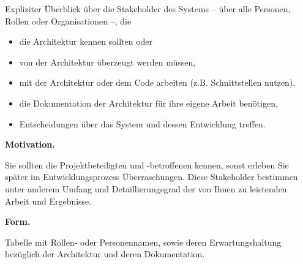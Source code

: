 \documentclass[]{article}
\begin{document}
Expliziter Überblick über die Stakeholder des Systems -- über alle
Personen, Rollen oder Organisationen --, die

\begin{itemize}
\item
  die Architektur kennen sollten oder
\item
  von der Architektur überzeugt werden müssen,
\item
  mit der Architektur oder dem Code arbeiten (z.B. Schnittstellen
  nutzen),
\item
  die Dokumentation der Architektur für ihre eigene Arbeit benötigen,
\item
  Entscheidungen über das System und dessen Entwicklung treffen.
\end{itemize}

\textbf{Motivation.}

Sie sollten die Projektbeteiligten und -betroffenen kennen, sonst
erleben Sie später im Entwicklungsprozess Überraschungen. Diese
Stakeholder bestimmen unter anderem Umfang und Detaillierungsgrad der
von Ihnen zu leistenden Arbeit und Ergebnisse.

\textbf{Form.}

Tabelle mit Rollen- oder Personennamen, sowie deren Erwartungshaltung
bezüglich der Architektur und deren Dokumentation.
\end{document}
